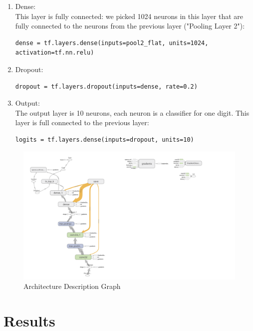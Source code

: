 \documentclass[12pt]{article}
\begin{document}
\begin{enumerate}
\item
Dense:\\
This layer is fully connected: we picked 1024 neurons in this layer that are fully connected to the neurons from the previous layer ("Pooling Layer 2"):
\begin{lstlisting}[style=PyStyle]
         dense = tf.layers.dense(inputs=pool2_flat, units=1024, activation=tf.nn.relu)    
\end{lstlisting}

\item
Dropout:
\begin{lstlisting}[style=PyStyle]
    dropout = tf.layers.dropout(inputs=dense, rate=0.2)
\end{lstlisting}

\item
Output:\\
The output layer is 10 neurons, each neuron is a classifier for one digit. This layer is full connected to the previous layer:
\begin{lstlisting}[style=PyStyle]
    logits = tf.layers.dense(inputs=dropout, units=10)
\end{lstlisting}

\end{enumerate}

\begin{figure}[H]
\caption{Architecture Description Graph}
\centering
\includegraphics[width=\linewidth]{Graphs.png}
\end{figure}

\newpage

\section{Results}
\end{document}
